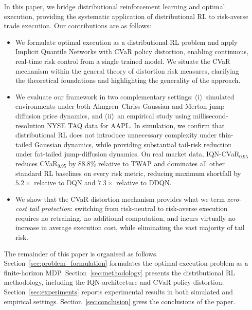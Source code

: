 \documentclass[11pt]{article}
\begin{document}
In this paper, we bridge distributional reinforcement learning and optimal execution, providing the systematic application of distributional RL to risk-averse trade execution. Our contributions are as follows:
\begin{itemize}
    \item We formulate optimal execution as a distributional RL problem and apply Implicit Quantile Networks with CVaR policy distortion, enabling continuous, real-time risk control from a single trained model. We situate the CVaR mechanism within the general theory of distortion risk measures, clarifying the theoretical foundations and highlighting the generality of the approach.
 
    \item We evaluate our framework in two complementary settings: (i)~simulated environments under both Almgren--Chriss Gaussian and Merton jump-diffusion price dynamics, and (ii)~an empirical study using millisecond-resolution NYSE TAQ data for AAPL. In simulation, we confirm that distributional RL does not introduce unnecessary complexity under thin-tailed Gaussian dynamics, while providing substantial tail-risk reduction under fat-tailed jump-diffusion dynamics. On real market data, IQN-CVaR$_{0.95}$ reduces CVaR$_{0.95}$ by 88.8\% relative to TWAP and dominates all other standard RL baselines on every risk metric, reducing maximum shortfall by $5.2\times$ relative to DQN and $7.3\times$ relative to DDQN.
 
    \item We show that the CVaR distortion mechanism provides what we term \emph{zero-cost tail protection}: switching from risk-neutral to risk-averse execution requires no retraining, no additional computation, and incurs virtually no increase in average execution cost, while eliminating the vast majority of tail risk.
\end{itemize}
 
The remainder of this paper is organised as follows. Section~\ref{sec:problem_formulation} formulates the optimal execution problem as a finite-horizon MDP. Section~\ref{sec:methodology} presents the distributional RL methodology, including the IQN architecture and CVaR policy distortion. Section~\ref{sec:experiments} reports experimental results in both simulated and empirical settings. Section~\ref{sec:conclusion} gives the conclusions of the paper.
 
\end{document}
